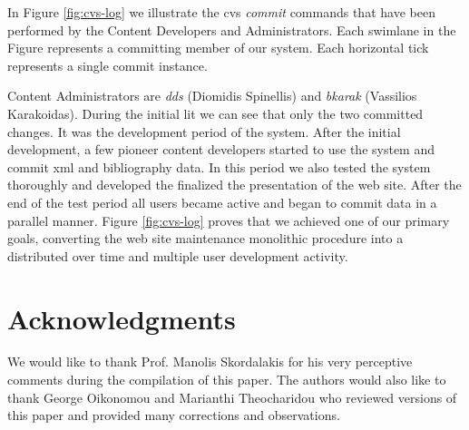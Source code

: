 \documentclass[10pt]{article}
\begin{document}
In Figure \ref{fig:cvs-log} we illustrate the {\sc cvs} \textit{commit} commands that have been performed by
the Content Developers and Administrators. Each swimlane in the Figure represents a committing
member of our system. Each horizontal tick represents a single commit instance.

Content Administrators are \textit{dds} (Diomidis Spinellis) and \textit{bkarak} (Vassilios Karakoidas). 
During the initial lit we can see that only the two committed 
changes. It was the development period of the system. After the initial development, a few 
pioneer content developers started to use the system and commit {\sc xml} and bibliography data. In this period 
we also tested the system thoroughly and developed the finalized the presentation of the web site. After the end of
the test period all users became active and began to commit data in a parallel manner. Figure \ref{fig:cvs-log} proves that we achieved 
one of our primary goals, converting the web site maintenance monolithic procedure into a distributed over time and multiple user development activity.

\section{Acknowledgments}
\label{sec:ack}

We would like to thank Prof. Manolis Skordalakis for his very perceptive comments during the compilation of this paper.
The authors would also like to thank George Oikonomou and Marianthi Theocharidou who reviewed versions 
of this paper and provided many corrections and observations.



\end{document}
